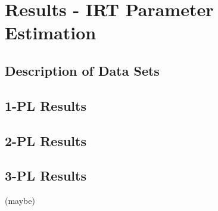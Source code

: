 \section{Results - IRT Parameter Estimation}

\subsection{Description of Data Sets}

\subsection{1-PL Results}

\subsection{2-PL Results}

\subsection{3-PL Results}
(maybe)


